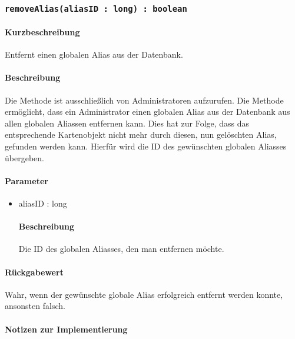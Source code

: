 \subsubsection{\texttt{removeAlias(aliasID : long) : boolean}}%
\paragraph*{Kurzbeschreibung}
Entfernt einen globalen Alias aus der Datenbank.
\paragraph*{Beschreibung}
Die Methode ist ausschließlich von Administratoren aufzurufen.
Die Methode ermöglicht, dass ein Administrator einen globalen Alias aus der Datenbank aus allen globalen Aliassen entfernen kann.
Dies hat zur Folge, dass das entsprechende Kartenobjekt nicht mehr durch diesen, nun gelöschten Alias, gefunden werden kann.
Hierfür wird die ID des gewünschten globalen Aliasses übergeben.
\paragraph*{Parameter}
\begin{itemize}
    \item aliasID : long
    		\paragraph*{Beschreibung}
    		Die ID des globalen Aliasses, den man entfernen möchte.
\end{itemize}
\paragraph*{Rückgabewert}
Wahr, wenn der gewünschte globale Alias erfolgreich entfernt werden konnte, ansonsten falsch.

\paragraph*{Notizen zur Implementierung}%
